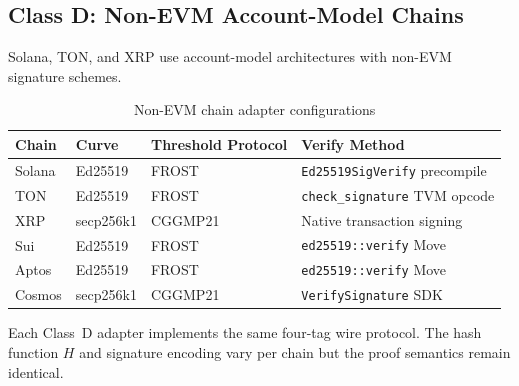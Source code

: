 \subsection{Class D: Non-EVM Account-Model Chains}
\label{sec:class-d}

Solana, TON, and XRP use account-model architectures with non-EVM signature schemes.

\begin{table}[H]
\centering
\begin{tabular}{llll}
\toprule
\textbf{Chain} & \textbf{Curve} & \textbf{Threshold Protocol} & \textbf{Verify Method} \\
\midrule
Solana   & Ed25519     & FROST    & \texttt{Ed25519SigVerify} precompile \\
TON      & Ed25519     & FROST    & \texttt{check\_signature} TVM opcode \\
XRP      & secp256k1   & CGGMP21  & Native transaction signing \\
Sui      & Ed25519     & FROST    & \texttt{ed25519::verify} Move \\
Aptos    & Ed25519     & FROST    & \texttt{ed25519::verify} Move \\
Cosmos   & secp256k1   & CGGMP21  & \texttt{VerifySignature} SDK \\
\bottomrule
\end{tabular}
\caption{Non-EVM chain adapter configurations}
\label{tab:non-evm}
\end{table}

Each Class~D adapter implements the same four-tag wire protocol. The hash function $H$ and signature encoding vary per chain but the proof semantics remain identical.

